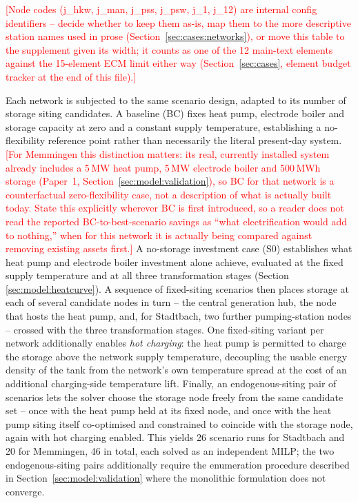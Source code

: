 \documentclass[review,3p]{elsarticle}
\newcommand{\placeholder}[1]{\textcolor{red}{[#1]}}
\begin{document}
\placeholder{Node codes (j\_hkw, j\_man, j\_pss, j\_psw, j\_1, j\_12) are
internal config identifiers -- decide whether to keep them as-is, map
them to the more descriptive station names used in prose
(Section~\ref{sec:cases:networks}), or move this table to the
supplement given its width; it counts as one of the 12 main-text
elements against the 15-element ECM limit either way
(Section~\ref{sec:cases}, element budget tracker at the end of this
file).}

Each network is subjected to the same scenario design, adapted to its
number of storage siting candidates. A baseline (BC) fixes heat pump,
electrode boiler and storage capacity at zero and a constant supply
temperature, establishing a no-flexibility reference point rather than
necessarily the literal present-day system.
\placeholder{For Memmingen this distinction matters: its
real, currently installed system already includes a 5\,MW heat pump,
5\,MW electrode boiler and 500\,MWh storage (Paper~1,
Section~\ref{sec:model:validation}), so BC for that network is a
counterfactual zero-flexibility case, not a description of what is
actually built today. State this explicitly wherever BC is first
introduced, so a reader does not read the reported BC-to-best-scenario
savings as ``what electrification would add to nothing,'' when for this
network it is actually being compared against removing existing assets
first.} A
no-storage investment case (S0) establishes what heat pump and electrode
boiler investment alone achieve, evaluated at the fixed supply
temperature and at all three transformation stages (Section
\ref{sec:model:heatcurve}). A sequence of fixed-siting scenarios then
places storage at each of several candidate nodes in turn -- the central
generation hub, the node that hosts the heat pump, and, for
Stadtbach, two further pumping-station nodes -- crossed
with the three transformation stages. One fixed-siting variant per
network additionally enables \emph{hot charging}: the heat pump is
permitted to charge the storage above the network supply temperature,
decoupling the usable energy density of the tank from the network's own
temperature spread at the cost of an additional charging-side
temperature lift. Finally, an endogenous-siting pair of scenarios lets
the solver choose the storage node freely from the same candidate set --
once with the heat pump held at its fixed node, and once with
the heat pump siting itself co-optimised and constrained to coincide
with the storage node, again with hot charging enabled. This yields
\num{26} scenario runs for Stadtbach and \num{20} for
Memmingen, \num{46} in total, each solved as an independent
MILP; the two endogenous-siting pairs additionally require the
enumeration procedure described in Section~\ref{sec:model:validation}
where the monolithic formulation does not converge.
\end{document}
